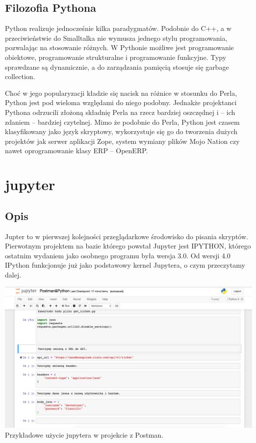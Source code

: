 \documentclass{article}
\begin{document}
 \subsection{Filozofia Pythona} 
 Python realizuje jednocześnie kilka paradygmatów. Podobnie do C++, a w przeciwieństwie do Smalltalka nie wymusza jednego stylu programowania, pozwalając na stosowanie różnych. W Pythonie możliwe jest programowanie obiektowe, programowanie strukturalne i programowanie funkcyjne. Typy sprawdzane są dynamicznie, a do zarządzania pamięcią stosuje się garbage collection.

Choć w jego popularyzacji kładzie się nacisk na różnice w stosunku do Perla, Python jest pod wieloma względami do niego podobny. Jednakże projektanci Pythona odrzucili złożoną składnię Perla na rzecz bardziej oszczędnej i – ich zdaniem – bardziej czytelnej. Mimo że podobnie do Perla, Python jest czasem klasyfikowany jako język skryptowy, wykorzystuje się go do tworzenia dużych projektów jak serwer aplikacji Zope, system wymiany plików Mojo Nation czy nawet oprogramowanie klasy ERP – OpenERP.
 \newpage
\section{jupyter}
\subsection{Opis}
Jupter to w pierwszej kolejności przeglądarkowe środowisko do pisania skryptów. Pierwotnym projektem na bazie którego powstał Jupyter jest IPYTHON, którego ostatnim wydaniem jako osobnego programu była wersja 3.0. Od wersji 4.0 IPython funkcjonuje już jako podstawowy kernel Jupytera, o czym przeczytamy dalej.

\includegraphics[width=1\textwidth]{jupyter.png}
{Przykładowe użycie jupytera w projekcie z Postman.}
\end{document}
